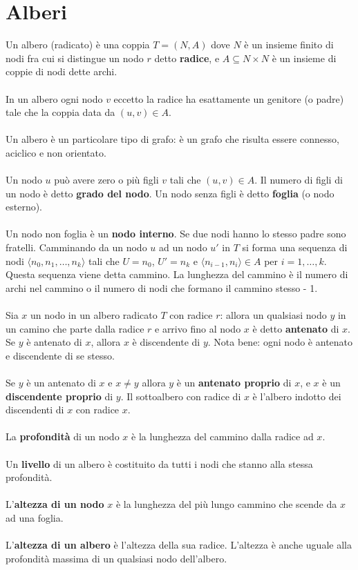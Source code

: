 \documentclass[italian]{article}
\begin{document}
\section{Alberi}
Un albero (radicato) è una coppia $T = (N,A)$ dove $N$ è un insieme finito di nodi fra cui si distingue un nodo $r$ detto \textbf{radice}, e $A \subseteq N \times N$ è un insieme di coppie di nodi dette archi. \\\\
In un albero ogni nodo $v$ eccetto la radice ha esattamente un genitore (o padre) tale che la coppia data da $(u,v) \in A$. \\\\
Un albero è un particolare tipo di grafo: è un grafo che risulta essere connesso, aciclico e non orientato. \\\\
Un nodo $u$ può avere zero o più figli $v$ tali che $(u,v) \in A$. Il numero di figli di un nodo è detto \textbf{grado del nodo}. Un nodo senza figli è detto \textbf{foglia} (o nodo esterno). \\\\
Un nodo non foglia è un \textbf{nodo interno}. Se due nodi hanno lo stesso padre sono fratelli. Camminando da un nodo $u$ ad un nodo $u'$ in $T$ si forma una sequenza di nodi $\langle n_0, n_1, \dots, n_k \rangle$ tali che $U = n_0$, $U' = n_k$ e $\langle n_{i-1}, n_i \rangle \in A$ per $i = 1, \dots, k$. Questa sequenza viene detta cammino. La lunghezza del cammino è il numero di archi nel cammino o il numero di nodi che formano il cammino stesso - 1. \\\\
Sia $x$ un nodo in un albero radicato $T$ con radice $r$: allora un qualsiasi nodo $y$ in un camino che parte dalla radice $r$ e arrivo fino al nodo $x$ è detto \textbf{antenato} di $x$. Se $y$ è antenato di $x$, allora $x$ è discendente di $y$. Nota bene: ogni nodo è antenato e discendente di se stesso. \\\\
Se $y$ è un antenato di $x$ e $x \neq y$ allora $y$ è un \textbf{antenato proprio} di $x$, e $x$ è un \textbf{discendente proprio} di $y$. Il sottoalbero con radice di $x$ è l'albero indotto dei discendenti di $x$ con radice $x$. \\\\
La \textbf{profondità} di un nodo $x$ è la lunghezza del cammino dalla radice ad $x$.\\\\
Un \textbf{livello} di un albero è costituito da tutti i nodi che stanno alla stessa profondità. \\\\
L'\textbf{altezza di un nodo} $x$ è la lunghezza del più lungo cammino che scende da $x$ ad una foglia. \\\\
L'\textbf{altezza di un albero} è l'altezza della sua radice. L'altezza è anche uguale alla profondità massima di un qualsiasi nodo dell'albero. 
\end{document}
